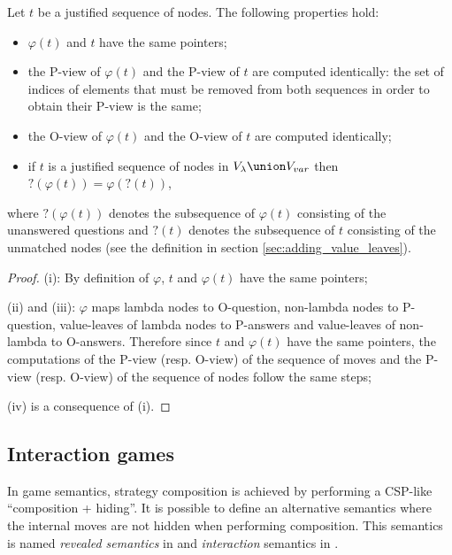 \begin{property}
\label{proper:phi_pview} Let $t$ be a justified sequence of nodes. The following properties hold:
\begin{itemize}
\item[(i)] $\varphi(t)$ and $t$ have the same pointers;
\item[(ii)] the P-view of $\varphi(t)$ and the P-view of $t$ are computed
identically: the set of indices of elements that must be removed
from both sequences in order to obtain their P-view is the same;
\item[(iii)] the O-view of $\varphi(t)$ and the O-view of $t$ are computed identically;
\item[(iv)] if $t$ is a justified sequence of nodes in $V_\lambda \union V_{var}$ then $?(\varphi(t)) =
\varphi(?(t))$,
\end{itemize}
where $?(\varphi(t))$ denotes the subsequence of $\varphi(t)$ consisting of the unanswered questions
and $?(t)$ denotes the subsequence of $t$ consisting of the unmatched nodes (see the
definition in section \ref{sec:adding_value_leaves}).
\end{property}
\begin{proof}
(i): By definition of $\varphi$, $t$ and $\varphi(t)$ have the same
pointers;

(ii) and (iii): $\varphi$ maps lambda nodes to O-question,
non-lambda nodes to P-question, value-leaves of lambda nodes to P-answers and
value-leaves of non-lambda to O-answers. Therefore since $t$ and $\varphi(t)$ have the
same pointers, the computations of the P-view (resp. O-view) of the
sequence of moves and the P-view (resp. O-view) of the sequence of
nodes follow the same steps;

(iv) is a consequence of (i).

\end{proof}


\subsection{Interaction games}
\label{sec:interaction_semantics}

In game semantics, strategy composition is achieved by performing a
CSP-like ``composition + hiding''. It is possible to define an
alternative semantics where the internal moves are not hidden when
performing composition. This semantics is named \emph{revealed
semantics} in \cite{willgreenlandthesis} and \emph{interaction}
semantics in \cite{DBLP:conf/sas/DimovskiGL05}.

